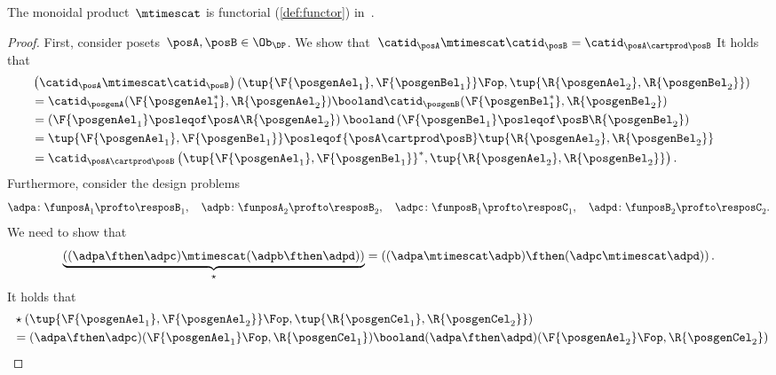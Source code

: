 \begin{lemma}
    \label{lem:monoidal_functorial}
    The monoidal product~$\mtimescat$ is functorial (\cref{def:functor}) in~\DP.
\end{lemma}
\begin{proof}
    First, consider posets~$\posA,\posB\in \Ob_\DP$.
    We show that~$\catid_\posA\mtimescat \catid_\posB = \catid_{\posA\cartprod \posB}$
    It holds that
    \begin{equation}
        \begin{aligned}
            ~ & \left( \catid_{\posA}\mtimescat \catid_{\posB}\right)
            \left( \tup{\F{\posgenAel_1},\F{\posgenBel_1}}\Fop,\tup{\R{\posgenAel_2},\R{\posgenBel_2}}\right) \\
              & =
            \catid_\posgenA(\F{\posgenAel_1^*},\R{\posgenAel_2})\booland \catid_\posgenB(\F{\posgenBel_1^*},\R{\posgenBel_2}) \\
              & =\left( \F{\posgenAel_1}\posleqof\posA \R{\posgenAel_2}\right)\booland \left( \F{\posgenBel_1}\posleqof\posB \R{\posgenBel_2}\right) \\
              & =\tup{\F{\posgenAel_1},\F{\posgenBel_1}}\posleqof{\posA\cartprod \posB}\tup{\R{\posgenAel_2},\R{\posgenBel_2}} \\
              & =\catid_{\posA\cartprod \posB}\left( \tup{\F{\posgenAel_1},\F{\posgenBel_1}}^*,\tup{\R{\posgenAel_2},\R{\posgenBel_2}}\right).
        \end{aligned}
    \end{equation}
    Furthermore, consider the design problems
    \begin{equation*}
        \adpa\colon \funposA_1 \profto \resposB_1,\quad \adpb\colon \funposA_2\profto \resposB_2, \quad \adpc\colon \funposB_1\profto \resposC_1,\quad \adpd\colon \funposB_2\profto \resposC_2.
    \end{equation*}
    We need to show that
    \begin{equation}
        \underbrace{\left( (\adpa\fthen \adpc) \mtimescat (\adpb\fthen \adpd)\right)}_{\star}=\left( (\adpa\mtimescat \adpb)\fthen (\adpc\mtimescat \adpd)\right).
    \end{equation}
    It holds that
    \begin{equation}
        \begin{aligned}
            ~ & \star \left( \tup{\F{\posgenAel_1},\F{\posgenAel_2}}\Fop,\tup{\R{\posgenCel_1},\R{\posgenCel_2}}\right) \\
              & = (\adpa\fthen \adpc)(\F{\posgenAel_1}\Fop,\R{\posgenCel_1})\booland (\adpa\fthen \adpd)(\F{\posgenAel_2}\Fop,\R{\posgenCel_2}) \\

\end{aligned}
\end{equation}
\end{proof}
